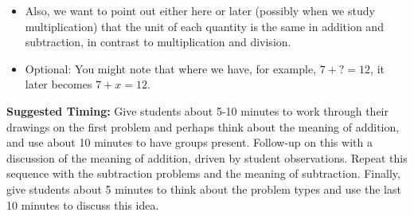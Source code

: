 \documentclass[nooutcomes,noauthor,handout]{ximera}
\begin{document}
\begin{instructorNotes}
\begin{itemize}
	\item Also, we want to point out either here or later (possibly when we study multiplication) that the unit of each quantity is the same in addition and subtraction, in contrast to multiplication and division.
	\item Optional: You might note that where we have, for example, $7 + ? = 12$, it later becomes $7 + x = 12$.
\end{itemize}

{\bf Suggested Timing:} Give students about 5-10 minutes to work through their drawings on the first problem and perhaps think about the meaning of addition, and use about 10 minutes to have groups present. Follow-up on this with a discussion of the meaning of addition, driven by student observations. Repeat this sequence with the subtraction problems and the meaning of subtraction. Finally, give students about 5 minutes to think about the problem types and use the last 10 minutes to discuss this idea.
\end{instructorNotes}
\end{document}
